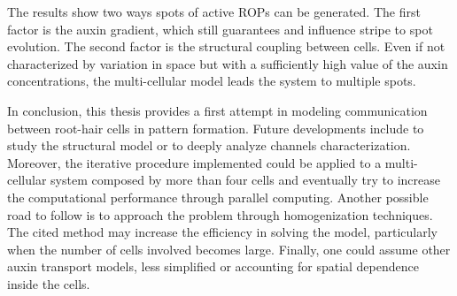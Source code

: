\documentclass[a4paper]{siamonline220329}
\begin{document}
The results show two ways spots of active ROPs can be generated. The first factor is the auxin gradient, which still guarantees and influence stripe to spot evolution. The second factor is the structural coupling between cells. Even if not characterized by variation in space but with a sufficiently high value of the auxin concentrations, the multi-cellular model leads the system to multiple spots.

In conclusion, this thesis provides a first attempt in modeling communication between root-hair cells in pattern formation. Future developments include to study the structural model or to deeply analyze channels characterization. Moreover, the iterative procedure implemented could be applied to a multi-cellular system composed by more than four cells and eventually try to increase the computational performance through parallel computing. Another possible road to follow is to approach the problem through homogenization techniques. The cited method may increase the efficiency in solving the model, particularly when the number of cells involved becomes large. Finally, one could assume other auxin transport models, less simplified or accounting for spatial dependence inside the cells.







\end{document}
